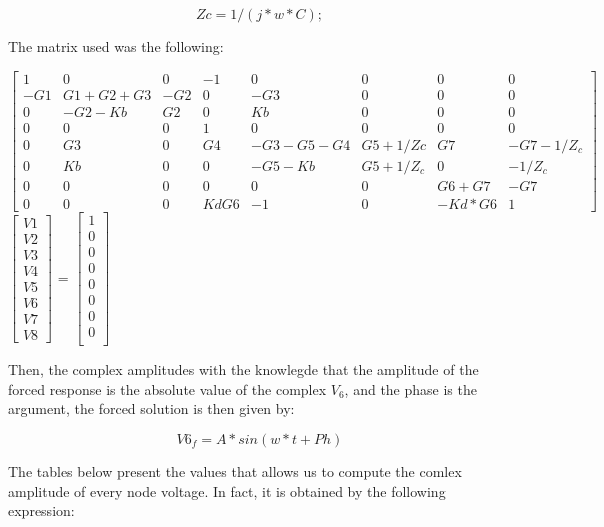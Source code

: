 \begin{equation}
Zc=1/(j*w*C);
\end{equation} 

\par The matrix used was the following:

$\begin{bmatrix}
1 & 0 & 0 & -1 & 0 & 0 & 0 & 0 \\
-G1 & G1+G2+G3 & -G2 & 0 & -G3 & 0 & 0 & 0 \\
0 & -G2-Kb & G2 & 0 & Kb & 0 & 0 & 0 \\
0 & 0 & 0 & 1 & 0 & 0 & 0 & 0 \\
0 & G3 & 0 & G4 &-G3-G5-G4 & G5+1/Zc & G7 & -G7-1/Z_{c}\\
0 & Kb & 0 & 0 & -G5-Kb & G5+1/Z_{c} & 0 & -1/Z_{c} \\
0 & 0 & 0 & 0 & 0 & 0 & G6+G7& -G7 \\
0 & 0 & 0 & KdG6 & -1 & 0 & -Kd*G6 & 1
\end{bmatrix}$
$\begin{bmatrix}
V1 \\ V2 \\ V3 \\ V4 \\ V5 \\ V6 \\ V7 \\ V8
\end{bmatrix}$
= 
$\begin{bmatrix}
1 \\ 0 \\ 0 \\ 0 \\ 0 \\ 0 \\ 0 \\ 0 \\ 
\end{bmatrix}$
\par Then, the complex amplitudes with the knowlegde that the amplitude of the forced response is the absolute value of the complex $V_{6}$, and the phase is the argument, the forced solution is then given by:

\begin{equation}
V6_f=A*sin(w*t+Ph)
\end{equation} 

\par The tables below present the values that allows us to compute the comlex amplitude of every node voltage. In fact, it is obtained by the following expression: 


